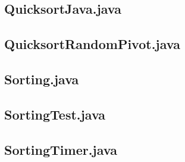 \documentclass[a4paper,10pt,twoside]{article}
\begin{document}
\subsection{QuicksortJava.java}


\subsection{QuicksortRandomPivot.java}


\subsection{Sorting.java}


\subsection{SortingTest.java}


\subsection{SortingTimer.java}




\end{document}
